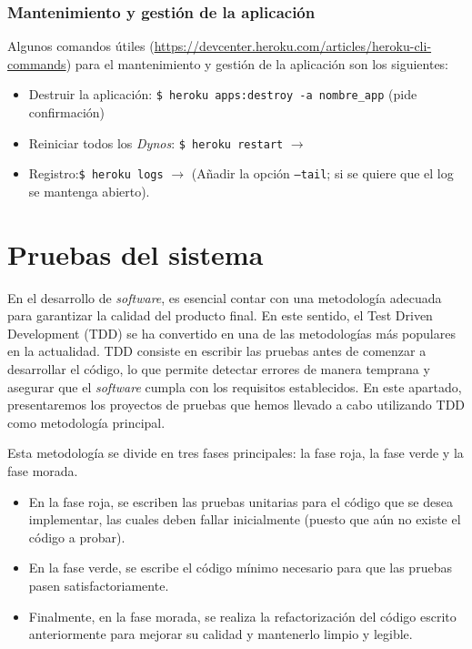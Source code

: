\subsubsection{Mantenimiento y gestión de la aplicación}
Algunos comandos útiles (\url{https://devcenter.heroku.com/articles/heroku-cli-commands}) para el mantenimiento y gestión de la aplicación son los siguientes:

\begin{itemize}
    \item Destruir la aplicación: \texttt{\$ heroku apps:destroy -a nombre\_app} (pide confirmación) \\
    
    \item Reiniciar todos los \textit{Dynos}: \texttt{\$ heroku restart} $\to$ 
    
    \item Registro:\texttt{\$ heroku logs} $\to$ (Añadir la opción \texttt{--tail}; si se quiere que el log se mantenga abierto).
\end{itemize}



\section{Pruebas del sistema}

En el desarrollo de \textit{software}, es esencial contar con una metodología adecuada para garantizar la calidad del producto final. En este sentido, el Test Driven Development (TDD) se ha convertido en una de las metodologías más populares en la actualidad. TDD consiste en escribir las pruebas antes de comenzar a desarrollar el código, lo que permite detectar errores de manera temprana y asegurar que el \textit{software} cumpla con los requisitos establecidos. En este apartado, presentaremos los proyectos de pruebas que hemos llevado a cabo utilizando TDD como metodología principal.

Esta metodología se divide en tres fases principales: la fase roja, la fase verde y la fase morada. 
\begin{itemize}
    \item En la fase roja, se escriben las pruebas unitarias para el código que se desea implementar, las cuales deben fallar inicialmente (puesto que aún no existe el código a probar). 
    \item En la fase verde, se escribe el código mínimo necesario para que las pruebas pasen satisfactoriamente.
    \item Finalmente, en la fase morada, se realiza la refactorización del código escrito anteriormente para mejorar su calidad y mantenerlo limpio y legible.
\end{itemize}

